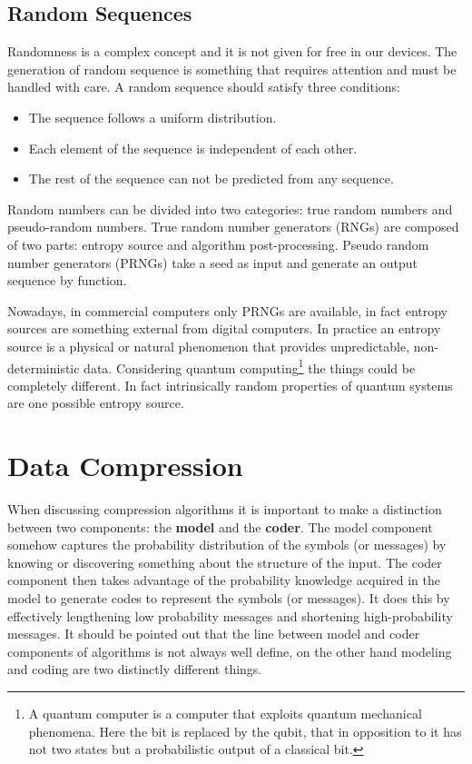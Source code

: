 \documentclass[12pt, a4paper]{report}
\begin{document}
\section{Random Sequences}

Randomness is a complex concept and it is not given for free in our devices.
The generation of random sequence is something that requires attention and must be handled with care.
A random sequence should satisfy three conditions:

\begin{itemize}
  \item The sequence follows a uniform distribution.
  \item Each element of the sequence is independent of each other.
  \item The rest of the sequence can not be predicted from any sequence.
\end{itemize}

Random numbers can be divided into two categories: true random numbers and pseudo-random numbers.
True random number generators (RNGs) are composed of two parts: entropy source and algorithm post-processing.
Pseudo random number generators (PRNGs) take a seed as input and generate an output sequence by function.

Nowadays, in commercial computers only PRNGs are available, in fact entropy sources are something external from digital computers.
In practice an entropy source is a physical or natural phenomenon that provides unpredictable, non-deterministic data.
Considering quantum computing\footnote{A quantum computer is a computer that exploits quantum mechanical phenomena. Here the bit
is replaced by the qubit, that in opposition to it has not two states but a probabilistic output of a classical bit.} the things
could be completely different.
In fact intrinsically random properties of quantum systems are one possible entropy source.

\chapter{Data Compression}

When discussing compression algorithms it is important to make a distinction between two components: the \textbf{model} and the
\textbf{coder}.
The model component somehow captures the probability distribution of the symbols (or messages) by knowing or discovering something
about the structure of the input.
The coder component then takes advantage of the probability knowledge acquired in the model to generate codes to represent the
symbols (or messages).
It does this by effectively lengthening low probability messages and shortening high-probability messages.
It should be pointed out that the line between model and coder components of algorithms is not always well define, on the other
hand modeling and coding are two distinctly different things.
\end{document}
